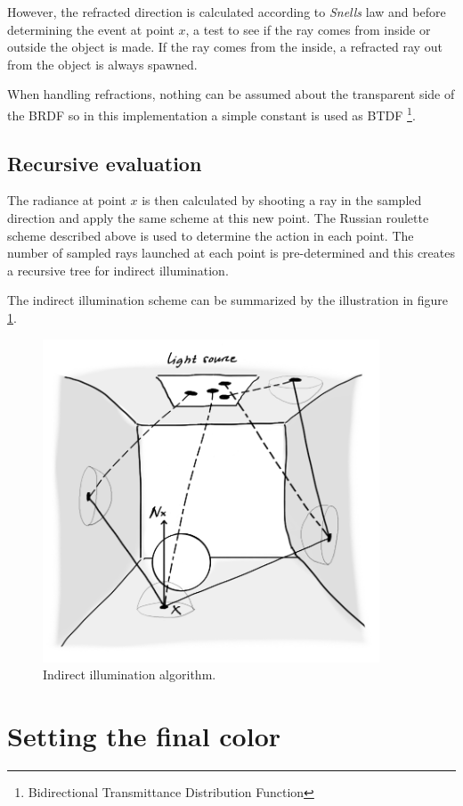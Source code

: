 \documentclass[a4paper]{report}
\begin{document}
However, the refracted direction is calculated according to \emph{Snells} law
and before determining the event at point \(x\), a test to see if the
ray comes from inside or outside the object is made. If the ray comes
from the inside, a refracted ray out from the object is always
spawned.

When handling refractions, nothing can be assumed about the
transparent side of the BRDF so in this implementation a simple
constant is used as BTDF \footnote{Bidirectional Transmittance
  Distribution Function}.

\subsection{Recursive evaluation}

The radiance at point \(x\) is then calculated by shooting a ray in
the sampled direction and apply the same scheme at this new point. The Russian
roulette scheme described above is used to determine the action in
each point. The number of sampled rays launched at each point is
pre-determined and this creates a recursive tree for indirect
illumination.

The indirect illumination scheme can be summarized by the illustration in figure \ref{fig:indirect}.

\begin{figure}[h]
  \centering
  \includegraphics[width=10cm]{figures/5}
  \caption{Indirect illumination algorithm.}
  \label{fig:indirect}
\end{figure}

\section{Setting the final color}
\end{document}
